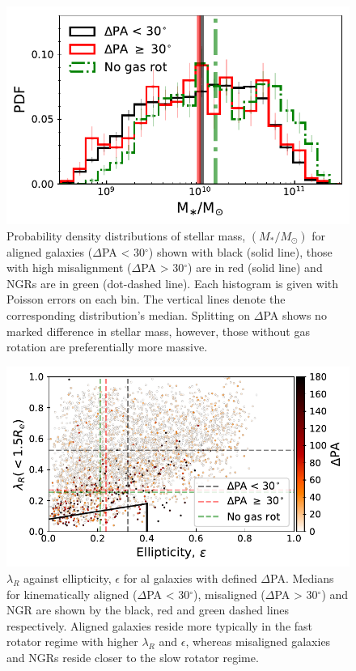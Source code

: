 \documentclass[fleqn,usenatbib]{mnras}
\begin{document}
\begin{figure}
	\includegraphics[width=\linewidth]{total_pop/delPA_stelM.pdf}
    \caption{Probability density distributions of stellar mass, $(M_{\ast}/M_{\odot})$ for aligned galaxies ($\Delta$PA < 30$^{\circ}$) shown with black (solid line), those with high misalignment ($\Delta$PA > 30$^{\circ}$) are in red (solid line) and NGRs are in green (dot-dashed line). Each histogram is given with Poisson errors on each bin. The vertical lines denote the corresponding distribution's median. Splitting on $\Delta$PA shows no marked difference in stellar mass, however, those without gas rotation are preferentially more massive.}
    \label{fig:delPA_stelM}
\end{figure}

\begin{figure}
	\includegraphics[width=\linewidth]{total_pop/delPA_lambda_Re.pdf}
    \caption{$\lambda_R$ against ellipticity, $\epsilon$ for al galaxies with defined $\Delta$PA. Medians for kinematically aligned ($\Delta$PA < 30$^{\circ}$), misaligned ($\Delta$PA > 30$^{\circ}$) and NGR are shown by the black, red and green dashed lines respectively. Aligned galaxies reside more typically in the fast rotator regime with higher $\lambda_R$ and $\epsilon$, whereas misaligned galaxies and NGRs reside closer to the slow rotator regime.}
    \label{fig:delPA_lambda_Re}
\end{figure}
\end{document}
